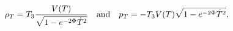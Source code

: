 \begin{equation}\label{rpt}
\rho_T = T_{3}\frac{V(T)}{\sqrt{1-e^{-2\Phi}\dot T^2}}~~~{\rm and}
~~~p_T = -T_{3}V(T)\sqrt{1-e^{-2\Phi}\dot T^2} ,
\end{equation}

